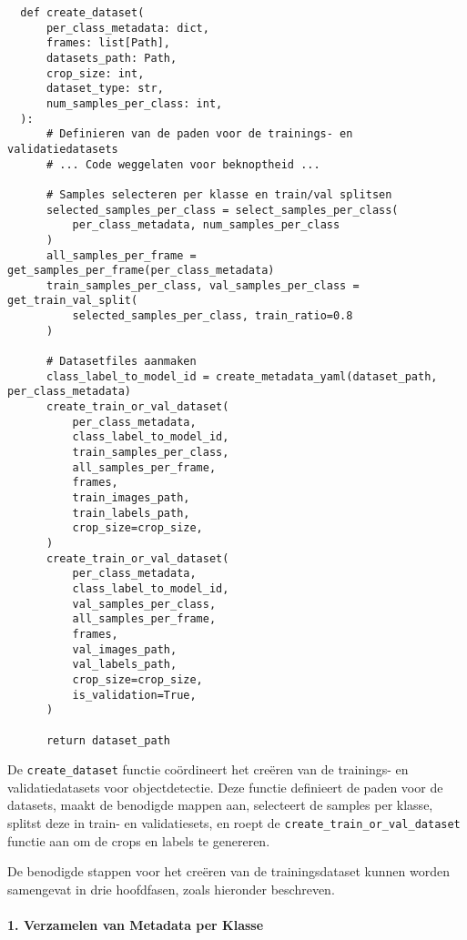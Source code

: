 \begin{listing}[H]
  \fontsize{10pt}{9.6pt}
  \begin{verbatim}
  def create_dataset(
      per_class_metadata: dict,
      frames: list[Path],
      datasets_path: Path,
      crop_size: int,
      dataset_type: str,
      num_samples_per_class: int,
  ):
      # Definieren van de paden voor de trainings- en validatiedatasets
      # ... Code weggelaten voor beknoptheid ...

      # Samples selecteren per klasse en train/val splitsen
      selected_samples_per_class = select_samples_per_class(
          per_class_metadata, num_samples_per_class
      )
      all_samples_per_frame = get_samples_per_frame(per_class_metadata)
      train_samples_per_class, val_samples_per_class = get_train_val_split(
          selected_samples_per_class, train_ratio=0.8
      )

      # Datasetfiles aanmaken
      class_label_to_model_id = create_metadata_yaml(dataset_path, per_class_metadata)
      create_train_or_val_dataset(
          per_class_metadata,
          class_label_to_model_id,
          train_samples_per_class,
          all_samples_per_frame,
          frames,
          train_images_path,
          train_labels_path,
          crop_size=crop_size,
      )
      create_train_or_val_dataset(
          per_class_metadata,
          class_label_to_model_id,
          val_samples_per_class,
          all_samples_per_frame,
          frames,
          val_images_path,
          val_labels_path,
          crop_size=crop_size,
          is_validation=True,
      )

      return dataset_path
  \end{verbatim}
  \caption[Functie voor het creëren van de objectdetectie-trainingsdataset]{
    \label{listing:create-dataset-overview}
    De \texttt{create\_dataset} functie coördineert het creëren van de trainings- en validatiedatasets voor objectdetectie.
    Deze functie definieert de paden voor de datasets, maakt de benodigde mappen aan,
    selecteert de samples per klasse, splitst deze in train- en validatiesets,
    en roept de \texttt{create\_train\_or\_val\_dataset} functie aan om de crops en labels te genereren. 
  }
\end{listing}

De benodigde stappen voor het creëren van de trainingsdataset kunnen worden samengevat in drie hoofdfasen, zoals hieronder beschreven.

\paragraph{1. Verzamelen van Metadata per Klasse}

